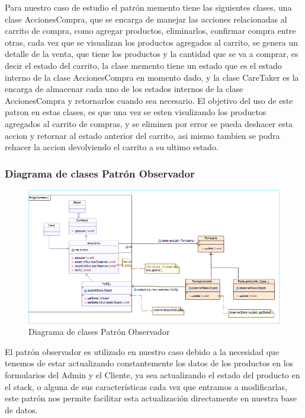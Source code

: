 Para nuestro caso de estudio el patrón memento tiene las siguientes clases, una clase AccionesCompra, que se encarga de manejar las acciones relacionadas al carrito de compra, como agregar productos, eliminarlos, confirmar compra entre otras, cada vez que se visualizan los productos agregados al carrito, se genera un detalle de la venta, que tiene los productos y la cantidad que se va a comprar, es decir el estado del carrito, la clase memento tiene un estado que es el estado interno de la clase AccionesCompra en momento dado, y la clase CareTaker es la encarga de almacenar cada uno de los estados internos de la clase AccionesCompra y retornarlos cuando sea necesario.\newline
El objetivo del uso de este patron en estas clases, es que una vez se esten visulizando los productos agregados al carrito de compras, y se eliminen por error se pueda deshacer esta accion y retornar al estado anterior del carrito, asi mismo tambien se podra rehacer la accion devolviendo el carrito a su ultimo estado.

\subsubsection*{Diagrama de clases Patrón Observador}
\begin{figure}[h!]
	\centering
	\includegraphics[width=1.0\linewidth]{arquitectura/imagenes/DiagramaObservador}
	\caption{Diagrama de clases Patrón Observador}
\end{figure}

El patrón observador es utilizado en nuestro caso debido a la necesidad que tenemos de estar actualizando constantemente los datos de los productos en los formularios del Admin y el Cliente, ya sea actualizando el estado del producto en el stack, o alguna de sus características cada vez que entramos a modificarlas, este patrón nos permite facilitar esta actualización directamente en nuestra base de datos.

